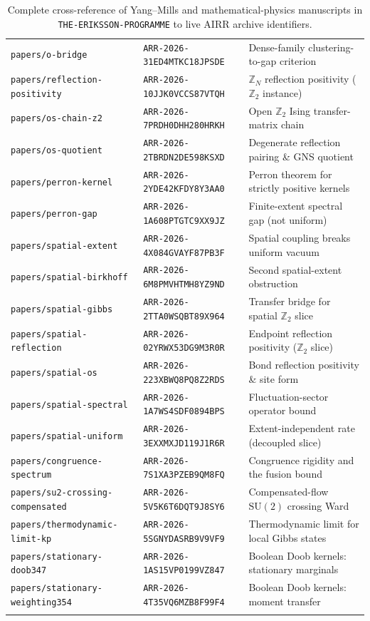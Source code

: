 \documentclass[11pt]{article}
\begin{document}
{\begin{longtable}{@{}>{\raggedright\arraybackslash}p{}>{\raggedright\arraybackslash}p{}>{\raggedright\arraybackslash}p{}@{}}
\texttt{papers/o-bridge} & \texttt{ARR-2026-31ED4MTKC18JPSDE} & Dense-family clustering-to-gap criterion \\
\texttt{papers/reflection-positivity} & \texttt{ARR-2026-10JJK0VCCS87VTQH} & $\mathbb{Z}_N$ reflection positivity ($\mathbb{Z}_2$ instance) \\
\texttt{papers/os-chain-z2} & \texttt{ARR-2026-7PRDH0DHH280HRKH} & Open $\mathbb{Z}_2$ Ising transfer-matrix chain \\
\texttt{papers/os-quotient} & \texttt{ARR-2026-2TBRDN2DE598KSXD} & Degenerate reflection pairing \& GNS quotient \\
\texttt{papers/perron-kernel} & \texttt{ARR-2026-2YDE42KFDY8Y3AA0} & Perron theorem for strictly positive kernels \\
\texttt{papers/perron-gap} & \texttt{ARR-2026-1A608PTGTC9XX9JZ} & Finite-extent spectral gap (not uniform) \\
\texttt{papers/spatial-extent} & \texttt{ARR-2026-4X084GVAYF87PB3F} & Spatial coupling breaks uniform vacuum \\
\texttt{papers/spatial-birkhoff} & \texttt{ARR-2026-6M8PMVHTMH8YZ9ND} & Second spatial-extent obstruction \\
\texttt{papers/spatial-gibbs} & \texttt{ARR-2026-2TTA0WSQBT89X964} & Transfer bridge for spatial $\mathbb{Z}_2$ slice \\
\texttt{papers/spatial-reflection} & \texttt{ARR-2026-02YRWX53DG9M3R0R} & Endpoint reflection positivity ($\mathbb{Z}_2$ slice) \\
\texttt{papers/spatial-os} & \texttt{ARR-2026-223XBWQ8PQ8Z2RDS} & Bond reflection positivity \& site form \\
\texttt{papers/spatial-spectral} & \texttt{ARR-2026-1A7WS4SDF0894BPS} & Fluctuation-sector operator bound \\
\texttt{papers/spatial-uniform} & \texttt{ARR-2026-3EXXMXJD119J1R6R} & Extent-independent rate (decoupled slice) \\
\texttt{papers/congruence-spectrum} & \texttt{ARR-2026-7S1XA3PZEB9QM8FQ} & Congruence rigidity and the fusion bound \\
\texttt{papers/su2-crossing-compensated} & \texttt{ARR-2026-5V5K6T6DQT9J8SY6} & Compensated-flow $\mathrm{SU}(2)$ crossing Ward \\
\texttt{papers/thermodynamic-limit-kp} & \texttt{ARR-2026-5SGNYDASRB9V9VF9} & Thermodynamic limit for local Gibbs states \\
\texttt{papers/stationary-doob347} & \texttt{ARR-2026-1AS15VP0199VZ847} & Boolean Doob kernels: stationary marginals \\
\texttt{papers/stationary-weighting354} & \texttt{ARR-2026-4T35VQ6MZB8F99F4} & Boolean Doob kernels: moment transfer \\
\bottomrule
\caption{Complete cross-reference of Yang--Mills and mathematical-physics manuscripts
in \texttt{THE-ERIKSSON-PROGRAMME} to live AIRR archive identifiers.}
\label{tab:airr}
\end{longtable}
}
\end{document}
